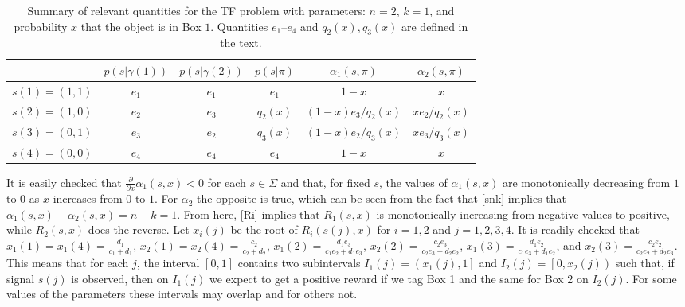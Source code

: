 \documentclass[a4paper,11pt]{article}
\begin{document}
\begin{table}
\begin{center}
	\begin{tabular}
{|c|c|c|c|c|c|} 
         \hline   $ $  & $p(s|\gamma(1))$ & $p(s|\gamma(2))$ & $p(s|\pi)$ & $\alpha_1(s,\pi)$ 
         & $\alpha_2(s,\pi)$ 
    \\
		\hline
         $s(1)=(1,1) $  & $e_1$  & $e_1$   &$e_1$      &  $1-x $  & $x$    \\
		\hline
         $ s(2)=(1,0)$   & $e_2$  & $e_3$    & $q_2(x)$  & $(1-x)e_3/q_2(x)$  & $xe_2/q_2(x)$  \\
		\hline
		$s(3)=(0,1)$     & $e_3$ & $e_2$     & $q_3(x)$  & $(1-x)e_2/q_3(x)$ & $xe_3/q_3(x)$   \\
        \hline
		$s(4)=(0,0)$    & $e_4$ & $e_4 $    &  $e_4$        & $1-x $    & $x$   \\
         \hline
	\end{tabular}
\end{center}
\caption{Summary of relevant quantities for the TF problem with parameters: $n=2$, $k=1$, and probability $x$ that the object is in Box $1$. Quantities $e_1$--$e_4$ and $q_2(x),q_3(x)$ are defined in the text.}\label{Tab:STF}
\end{table}

It is easily checked that $\frac{\partial}{\partial x} \alpha_1(s,x)<0$ for each $s\in\Sigma$ and that, for fixed $s$, the values of $\alpha_1(s,x)$ are monotonically decreasing from $1$ to $0$ as $x$ increases from $0$ to $1$. For $\alpha_2$ the opposite is true, which can be seen from the fact that \eqref{snk} implies that $\alpha_1(s,x)+\alpha_2(s,x)=n-k=1$.  From here, \eqref{Ri} implies that $R_1(s,x)$ is monotonically increasing from negative values to positive, while $R_2(s,x)$ does the reverse. Let $x_i(j)$ be the root of $R_i(s(j),x)$ for $i=1,2$ and $j=1,2,3,4$. It is readily checked that $x_1(1) = x_1(4) = \frac{d_1}{c_1+d_1}$, $x_2(1) = x_2(4) = \frac{c_2}{c_2+d_2}$, $x_1(2) = \frac{d_1 e_3}{c_1 e_2+d_1e_3}$, $x_2(2) = \frac{c_2 e_3}{c_2 e_3+d_2e_2}$, $x_1(3) = \frac{d_1 e_2}{c_1 e_3+d_1e_2}$, and $x_2(3) = \frac{c_2 e_2}{c_2 e_2+d_2e_3}$. This means that for each $j$, the interval $[0,1]$ contains two subintervals $I_1(j)=\left(x_1(j),1\right]$ and $I_2(j)=\left[0,x_2(j)\right)$ such that, if signal $s(j)$ is observed, then on $I_1(j)$ we expect to get a positive reward if we tag Box 1 and the same for Box 2 on  $I_2(j)$. For some values of the parameters these intervals may overlap and for others not. 
\end{document}
